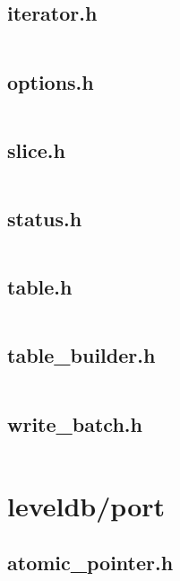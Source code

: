 \documentclass{article}
\begin{document}
\subsection{iterator.h}
\inputminted{cpp}{/home/dufferzafar/dev/@clones/bitcoin/src/leveldb/include/leveldb/iterator.h}
\newpage

\subsection{options.h}
\inputminted{cpp}{/home/dufferzafar/dev/@clones/bitcoin/src/leveldb/include/leveldb/options.h}
\newpage

\subsection{slice.h}
\inputminted{cpp}{/home/dufferzafar/dev/@clones/bitcoin/src/leveldb/include/leveldb/slice.h}
\newpage

\subsection{status.h}
\inputminted{cpp}{/home/dufferzafar/dev/@clones/bitcoin/src/leveldb/include/leveldb/status.h}
\newpage

\subsection{table.h}
\inputminted{cpp}{/home/dufferzafar/dev/@clones/bitcoin/src/leveldb/include/leveldb/table.h}
\newpage

\subsection{table\_builder.h}
\inputminted{cpp}{/home/dufferzafar/dev/@clones/bitcoin/src/leveldb/include/leveldb/table_builder.h}
\newpage

\subsection{write\_batch.h}
\inputminted{cpp}{/home/dufferzafar/dev/@clones/bitcoin/src/leveldb/include/leveldb/write_batch.h}
\newpage

\section{leveldb/port}

\subsection{atomic\_pointer.h}
\inputminted{cpp}{/home/dufferzafar/dev/@clones/bitcoin/src/leveldb/port/atomic_pointer.h}
\newpage
\end{document}
